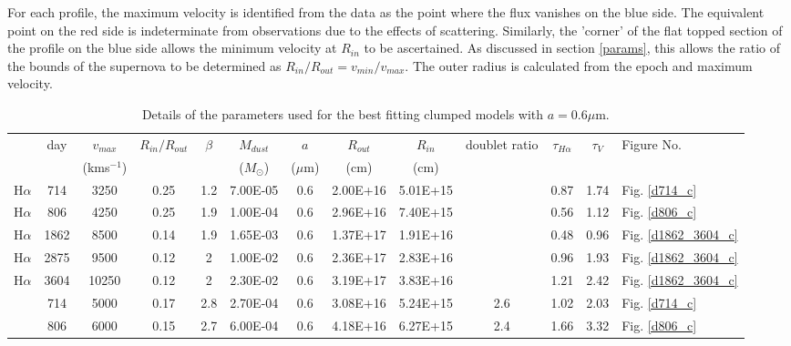 \documentclass[useAMS,usenatbib,usegraphicx]{mnras}
\begin{document}
For each profile, the maximum velocity is identified from the data as the point where the flux vanishes on the blue side.  The equivalent point on the red side is indeterminate from observations due to the effects of scattering.  Similarly, the 'corner' of the flat topped section of the profile on the blue side allows the minimum velocity at $R_{in}$ to be ascertained. As discussed in section \ref{params}, this allows the ratio of the bounds of the supernova to be determined as $R_{in}/R_{out}=v_{min}/v_{max}$.  The outer radius is calculated from the epoch and maximum velocity.

\begin{table}
	\begin{minipage}{180mm}
	\caption{Details of the parameters used for the best fitting clumped models with $a=0.6\mu$m.}
	\label{clumped1}
	\begin{center}
  	\begin{tabular}{@{} ccccccccccccl @{}}
    	\hline
 & day & $v_{max}$ & $R_{in}/R_{out}$ & $\beta$ & $M_{dust}$ & $a$ & $R_{out}$ & $R_{in}$ &  doublet ratio & $\tau_{H\alpha}$ & $\tau_V$  & Figure No. \\
	&& (kms$^{-1} $) & & & ($M_{\odot}$) & ($\mu$m) & (cm) & (cm)  \\
	\hline
H$\alpha$ & 714 & 3250 & 0.25 & 1.2 & 7.00E-05 & 0.6 & 2.00E+16 & 5.01E+15 & & 0.87 & 1.74 & Fig. \ref{d714_c} \\
H$\alpha$ & 806 & 4250 & 0.25 & 1.9 & 1.00E-04 & 0.6 & 2.96E+16 & 7.40E+15 & & 0.56 & 1.12 & Fig. \ref{d806_c}\\
H$\alpha$ & 1862 & 8500 & 0.14 & 1.9 & 1.65E-03 & 0.6 & 1.37E+17 & 1.91E+16 & & 0.48 & 0.96 & Fig. \ref{d1862_3604_c}\\
H$\alpha$ & 2875 & 9500 & 0.12 & 2 & 1.00E-02 & 0.6 & 2.36E+17 & 2.83E+16 & & 0.96 & 1.93 & Fig. \ref{d1862_3604_c}\\
H$\alpha$ & 3604 & 10250 & 0.12 & 2 & 2.30E-02 & 0.6 & 3.19E+17 & 3.83E+16 & & 1.21 & 2.42 & Fig. \ref{d1862_3604_c}\\ \relax
[OI] & 714 & 5000 & 0.17 & 2.8 & 2.70E-04 & 0.6 & 3.08E+16 & 5.24E+15 & 2.6 &  1.02 & 2.03 & Fig. \ref{d714_c}\\ \relax
[OI] & 806 & 6000 & 0.15 & 2.7 & 6.00E-04 & 0.6 & 4.18E+16 & 6.27E+15 & 2.4 & 1.66 & 3.32 & Fig. \ref{d806_c}\\
    \hline
  \end{tabular}
  \end{center}
\end{minipage}
\end{table}
\end{document}

